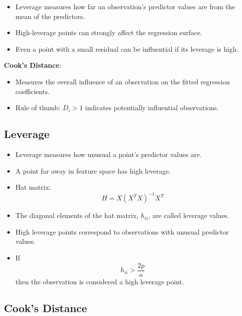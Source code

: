 \documentclass[10pt,a4paper]{article}
\begin{document}
	\begin{itemize}
		\item Leverage measures how far an observation's predictor values are from the mean of the predictors.
		\item High-leverage points can strongly affect the regression surface.
		\item Even a point with a small residual can be influential if its leverage is high.
	\end{itemize}

	\textbf{Cook's Distance}:
	\begin{itemize}
		\item Measures the overall influence of an observation on the fitted regression coefficients.
		\item Rule of thumb: $D_i > 1$ indicates potentially influential observations.
	\end{itemize}
	
	\subsection{Leverage}
	
	\begin{itemize}
	    \item Leverage measures how unusual a point’s predictor values are.
	    
	    \item A point far away in feature space has high leverage.
	    
	    \item Hat matrix:
	    $$
	    H = X(X^TX)^{-1}X^T
	    $$
	    
	    \item The diagonal elements of the hat matrix, $h_{ii}$, are called leverage values.
	    
	    \item High leverage points correspond to observations with unusual predictor values.
	    
	    \item If
	    $$
	    h_{ii} > \frac{2p}{n}
	    $$
	    then the observation is considered a high leverage point.
	\end{itemize}
	
	\subsection{Cook's Distance}
	
\end{document}
